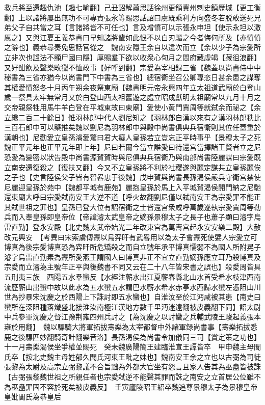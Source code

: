救兵將至還趣仇池【趣七喻翻】己丑詔解蕭思話徐州更領冀州刺史鎮歷城【更工衡翻】上以諸將屢出無功不可專責張永等賜思話詔曰虜既乘利方向盛冬若脱敢送死兄弟父子自共當之耳【言諸將皆不可任也】言及增憤可以示張永申坦【使示永坦以激厲之】又與江夏王義恭書曰早知諸將輩如此恨不以白刃驅之今者悔何所及【亦憤憤之辭也】義恭尋奏免思話官從之　魏南安隱王余自以違次而立【余以少子為宗愛所立非次也諡法不顯尸國曰隱】厚賜羣下欲以收衆心旬月之間府藏虛竭【藏徂浪翻】又好酣飲及聲樂畋獵不恤政事【好呼到翻】宗愛為宰相録三省【魏蓋以尚書侍中中秘書為三省亦猶今以尚書門下中書為三省也】總宿衛坐召公卿專恣日甚余患之謀奪其權愛憤怒冬十月丙午朔余夜祭東廟【魏書明元帝永興四年立太祖道武廟於白登山歲一祭具太牢無常月又於白登山西太祖舊遊之處立昭成獻明太祖廟常以九月十月之交帝親祭牲用馬牛羊白登在平城東故曰東廟】愛使小黄門賈周等就弑余而祕之【余立纔二百二十餘日】惟羽林郎中代人劉尼知之【羽林郎自漢以來有之漢羽林郎秩比三百石郎中可以槩推矣魏以劉尼為羽林郎中與殿中尚書俱典兵宿衛則其位任蓋重於漢朝也】尼勸愛立皇孫濬愛驚曰君大癡人皇孫若立豈忘正平時事乎【景穆太子之死魏正平元年也正平元年即上年】尼曰若爾今當立誰愛曰待還宫當擇諸王賢者立之尼恐愛為變密以狀告殿中尚書源賀賀時與尼俱典兵宿衛乃與南部尚書陸麗謀曰宗愛既立南安還復殺之【復扶又翻】今又不立皇孫將不利於社稷遂與麗定謀共立皇孫麗俟之子也【史言陸侯父子皆有智畧忠于後魏】戊申賀與尚書長孫渴侯嚴兵守衛宫禁使尼麗迎皇孫於苑中【魏都平城有鹿苑】麗抱皇孫於馬上入平城賀渴侯開門納之尼馳還東廟大呼曰宗愛弑南安王大逆不道【呼火故翻劉尼僅以弑南安王為宗愛罪不能正其弑世祖之罪也】皇孫已登大位有詔宿衛之士皆還宫衆咸呼萬歲遂執宗愛賈周等勒兵而入奉皇孫即皇帝位【帝諱濬太武皇帝之嫡孫景穆太子之長子也蕭子顯曰濬字烏雷直勤】登永安殿【北史魏太武帝始光二年改東宫為萬夀宫起永安安樂二殿】大赦改元興安　【考異曰宋索虜傳燾以烏弈旰有武畧用以為太子會燾死使嬖人宗愛立可博真為後宗愛博真恐為弈旰所危矯殺之而自立號年承平博真懦弱不為國人所附晃子濬字烏雷直勤素為燾所愛燕王謂國人曰博真非正不宜立直勤嫡孫應立耳乃殺博真及宗愛而立濬為主號年正平與後魏書不同又云在二十八年皆宋書之誤也】殺愛周皆具五刑夷三族　西陽五水羣蠻反【水經注蘄水出江夏蘄春縣北山水首受希水枝津西南流歷蘄山出蠻中故以此水為五水蠻五水謂巴水蘄水希水赤亭水西歸水蠻左憑阻山川世為抄暴宋沈慶之於西陽上下誅討即五水蠻也】自淮汝至於江沔咸被其患【南史曰蠻所在深阻種落熾盛北接淮汝南極江漢地方數千里沔迷遠翻被皮義翻下同】詔太尉中兵參軍沈慶之督江豫荆雍四州兵討之【為沈慶之以討蠻之兵輔武陵王駿起義張本雍於用翻】　魏以驃騎大將軍拓拔壽樂為太宰都督中外諸軍録尚書事【壽樂拓拔悉鹿之後驃匹妙翻騎奇計翻樂音洛】長孫渴侯為尚書令加儀同三司【賞定策之功也】十一月壽樂渴侯坐爭權並賜死　癸未魏廣陽簡王建臨淮宣王譚皆卒　甲申魏主母閭氏卒【按北史魏主母姓郁久閭氏河東王毗之妹也】魏南安王余之立也以古弼為司徒張黎為太尉及高宗立弼黎議不合旨黜為外都大官坐有怨言且家人告其為巫蠱皆被誅【古弼張黎魏世祖之所親任者也宗愛弑逆不能聲其罪而誅之南安之立首居公位雖不為巫蠱罪固不容於死矣被皮義反】　壬寅廬陵昭王紹卒魏追尊景穆太子為景穆皇帝皇妣閭氏為恭皇后

